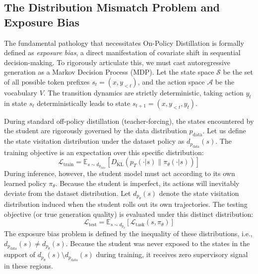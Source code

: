 \documentclass{article} %
\newcommand{\KL}{D_{\mathrm{KL}}}
\newcommand{\ptheta}{p_\theta}
\newcommand{\pteacher}{p_T}
\newcommand{\pdata}{p_{\mathrm{data}}}
\newcommand{\loss}{\mathcal{L}}
\begin{document}
\subsection{The Distribution Mismatch Problem and Exposure Bias}
\label{subsec:exposure_bias}

The fundamental pathology that necessitates On-Policy Distillation is formally defined as \textit{exposure bias}, a direct manifestation of covariate shift in sequential decision-making. To rigorously articulate this, we must cast autoregressive generation as a Markov Decision Process (MDP). Let the state space $\mathcal{S}$ be the set of all possible token prefixes $s_t = (x, y_{<t})$, and the action space $\mathcal{A}$ be the vocabulary $V$. The transition dynamics are strictly deterministic, taking action $y_t$ in state $s_t$ deterministically leads to state $s_{t+1} = (x, y_{<t}, y_t)$. 

During standard off-policy distillation (teacher-forcing), the states encountered by the student are rigorously governed by the data distribution $\pdata$. Let us define the state visitation distribution under the dataset policy as $d_{\pdata}(s)$. The training objective is an expectation over this specific distribution:
\begin{equation}
    \loss_{\mathrm{train}} = \mathbb{E}_{s \sim d_{\pdata}} \left[ \KL(\pteacher(\cdot|s) \parallel \pi_\theta(\cdot|s)) \right]
\end{equation}
During inference, however, the student model must act according to its own learned policy $\pi_\theta$. Because the student is imperfect, its actions will inevitably deviate from the dataset distribution. Let $d_{\ptheta}(s)$ denote the state visitation distribution induced when the student rolls out its own trajectories. The testing objective (or true generation quality) is evaluated under this distinct distribution:
\begin{equation}
    \loss_{\mathrm{test}} = \mathbb{E}_{s \sim d_{\ptheta}} \left[ \loss_{\mathrm{task}}(s, \pi_\theta) \right]
\end{equation}
The exposure bias problem is defined by the inequality of these distributions, i.e., $d_{\pdata}(s) \neq d_{\ptheta}(s)$. Because the student was never exposed to the states in the support of $d_{\ptheta}(s) \setminus d_{\pdata}(s)$ during training, it receives zero supervisory signal in these regions. 
\end{document}
